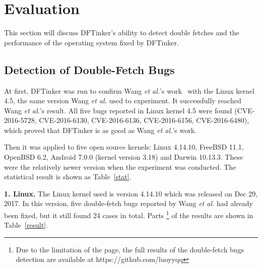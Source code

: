 \documentclass[10pt]{llncs}
\begin{document}
\section{Evaluation}%
\label{evalue}
This section will discuss DFTinker's ability to detect double fetches and the performance of the operating system fixed by DFTinker.
\subsection{Detection of Double-Fetch Bugs}
\label{evalue1}


At first, DFTinker was run to confirm Wang \textit{et al.}'s work~\cite{wang} with the Linux kernel 4.5, the same version Wang \textit{et al.} used to experiment. It successfully reached Wang \textit{et al.}'s result. All five bugs reported in Linux kernel 4.5 were found (CVE-2016-5728, CVE-2016-6130, CVE-2016-6136, CVE-2016-6156, CVE-2016-6480), which proved that DFTinker is as good as Wang \textit{et al.}'s work.


Then it was applied to five open source kernels: Linux 4.14.10, FreeBSD 11.1, OpenBSD 6.2, Android 7.0.0 (kernel version 3.18) and Darwin 10.13.3. These were the relatively newer version when the experiment was conducted. The statistical result is shown as Table~\ref{stat}.

\textbf{1. Linux.} The Linux kernel used is version 4.14.10 which was released on Dec 29, 2017. In this version, five double-fetch bugs reported by Wang \textit{et al.} had already been fixed, but it still found 24 cases in total. Parts
\footnote{Due to the limitation of the page, the full results of the double-fetch bugs detection are available at https://github.com/luoyyqq}​ of the results are shown in Table~\ref{result}.
\end{document}
